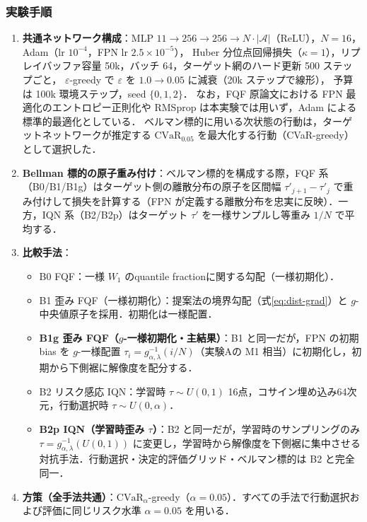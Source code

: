 \documentclass[a4paper,10pt]{jsarticle}
\theoremstyle{definition}
\newcommand{\CVaR}{\mathrm{CVaR}}
\newcommand{\Wone}{W_1}
\begin{document}
\subsubsection{実験手順}
\begin{enumerate}
  \item \textbf{共通ネットワーク構成}：MLP $11\to256\to256\to N\cdot|\mathcal A|$（ReLU），$N=16$，Adam（lr $10^{-4}$，FPN lr $2.5\times10^{-5}$），
  Huber 分位点回帰損失（$\kappa=1$），リプレイバッファ容量 50k，バッチ 64，ターゲット網のハード更新 500 ステップごと，
  $\varepsilon$-greedy で $\varepsilon$ を $1.0\to0.05$ に減衰（20k ステップで線形），
  予算は 100k 環境ステップ，seed $\{0,1,2\}$．
  なお，FQF 原論文における FPN 最適化のエントロピー正則化や RMSprop は本実験では用いず，Adam による標準的最適化としている．
  ベルマン標的に用いる次状態の行動は，ターゲットネットワークが推定する $\CVaR_{0.05}$ を最大化する行動（CVaR-greedy）として選択した．
  \item \textbf{Bellman 標的の原子重み付け}：ベルマン標的を構成する際，FQF 系（B0/B1/B1g）はターゲット側の離散分布の原子を区間幅 $\tau'_{j+1}-\tau'_j$ で重み付けして損失を計算する（FPN が定義する離散分布を忠実に反映）．一方，IQN 系（B2/B2p）はターゲット $\tau'$ を一様サンプルし等重み $1/N$ で平均する．
  \item \textbf{比較手法}：
  \begin{itemize}
    \item B0 FQF：一様 $\Wone$ のquantile fractionに関する勾配（一様初期化）．
    \item B1 歪み FQF（一様初期化）：提案法の境界勾配（式\eqref{eq:dist-grad}）と $g$-中央値原子を採用．初期化は一様配置．
    \item \textbf{B1g 歪み FQF（$g$-一様初期化・主結果）}：B1 と同一だが，FPN の初期 bias を $g$-一様配置 $\tau_i = g^{-1}_{\alpha,\lambda}(i/N)$（実験Aの M1 相当）に初期化し，初期から下側裾に解像度を配分する．
    \item B2 リスク感応 IQN：学習時 $\tau\sim U(0,1)$ 16点，コサイン埋め込み64次元，行動選択時 $\tau\sim U(0,\alpha)$．
    \item \textbf{B2p IQN（学習時歪み $\tau$）}：B2 と同一だが，学習時のサンプリングのみ $\tau = g^{-1}_{\alpha,\lambda}(U(0,1))$ に変更し，学習時から解像度を下側裾に集中させる対抗手法．行動選択・決定的評価グリッド・ベルマン標的は B2 と完全同一．
  \end{itemize}
  \item \textbf{方策（全手法共通）}：$\CVaR_\alpha$-greedy（$\alpha=0.05$）．すべての手法で行動選択および評価に同じリスク水準 $\alpha=0.05$ を用いる．

\end{enumerate}
\end{document}
